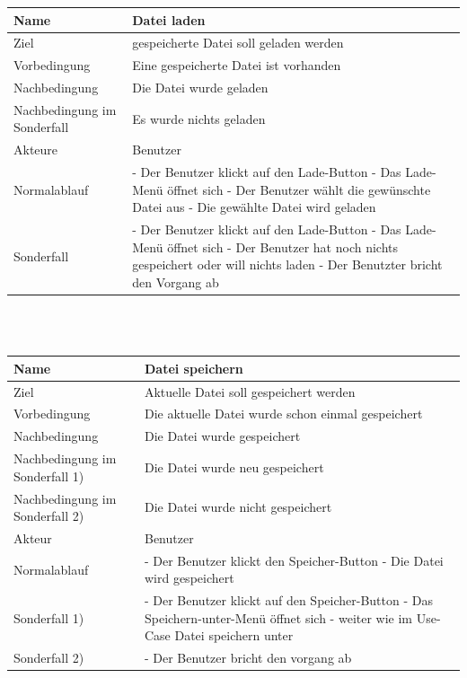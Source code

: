 \documentclass[a4paper,10pt]{scrartcl}
\begin{document}
\begin{tabular}{|p{5cm}|p{10cm}|}
\hline Name & Datei laden \\ 
\hline Ziel & gespeicherte Datei soll geladen werden \\ 
\hline Vorbedingung & Eine gespeicherte Datei ist vorhanden \\ 
\hline Nachbedingung & Die Datei wurde geladen \\ 
\hline Nachbedingung im Sonderfall & Es wurde nichts geladen \\ 
\hline Akteure & Benutzer \\ 
\hline Normalablauf & - Der Benutzer klickt auf den Lade-Button
\newline 
- Das Lade-Menü öffnet sich
\newline 
- Der Benutzer wählt die gewünschte Datei aus
\newline 
- Die gewählte Datei wird geladen
\\ 
\hline Sonderfall &  
 - Der Benutzer klickt auf den Lade-Button
 \newline
 - Das Lade-Menü öffnet sich
 \newline
 - Der Benutzer hat noch nichts gespeichert oder will nichts laden
 \newline
 - Der Benutzter bricht den Vorgang ab
\\
\hline 
\end{tabular} 
\\
\\
\begin{tabular}{|p{5cm}|p{10cm}|}
\hline Name & Datei speichern \\ 
\hline Ziel & Aktuelle Datei soll gespeichert werden \\ 
\hline Vorbedingung & Die aktuelle Datei wurde schon einmal gespeichert \\ 
\hline Nachbedingung & Die Datei wurde gespeichert \\ 
\hline Nachbedingung im Sonderfall 1) & Die Datei wurde neu gespeichert \\ 
\hline Nachbedingung im Sonderfall 2) & Die Datei wurde nicht gespeichert\\
\hline Akteur & Benutzer \\ 
\hline Normalablauf & - Der Benutzer klickt den Speicher-Button 
\newline
- Die Datei wird gespeichert
\\
\hline Sonderfall 1) & - Der Benutzer klickt auf den Speicher-Button
\newline
- Das Speichern-unter-Menü öffnet sich
\newline
- weiter wie im Use-Case Datei speichern unter
 \\ 
 \hline Sonderfall 2) & - Der Benutzer bricht den vorgang ab \\
\hline 
\end{tabular} 
\end{document}
